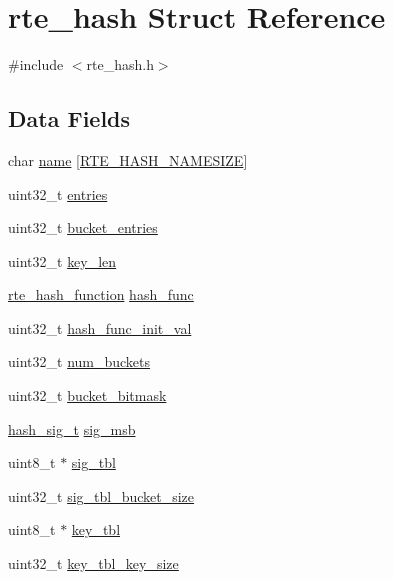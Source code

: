 \hypertarget{structrte__hash}{}\section{rte\+\_\+hash Struct Reference}
\label{structrte__hash}


{\ttfamily \#include $<$rte\+\_\+hash.\+h$>$}

\subsection*{Data Fields}
\begin{DoxyCompactItemize}
\item 
char \hyperlink{structrte__hash_a43ab7746b9b72f04b2e6dadf8365f41b}{name} \mbox{[}\hyperlink{rte__hash_8h_a6f2eca61b3180fccd47b5170fa115d48}{R\+T\+E\+\_\+\+H\+A\+S\+H\+\_\+\+N\+A\+M\+E\+S\+I\+Z\+E}\mbox{]}
\item 
uint32\+\_\+t \hyperlink{structrte__hash_a38bad35c844ffd72b0c1132715d5f3a1}{entries}
\item 
uint32\+\_\+t \hyperlink{structrte__hash_ad1c0b79e09e6b654bc7c268a9ec0084f}{bucket\+\_\+entries}
\item 
uint32\+\_\+t \hyperlink{structrte__hash_a7250588fe859c80e349c79c2b15ee421}{key\+\_\+len}
\item 
\hyperlink{rte__hash_8h_a1b12fdd40a9aa9aa254d45b052e57350}{rte\+\_\+hash\+\_\+function} \hyperlink{structrte__hash_aca908537bdd20d4ca4d4c7fd6c392903}{hash\+\_\+func}
\item 
uint32\+\_\+t \hyperlink{structrte__hash_a01ac433d404852455c8fb211a4d43b2a}{hash\+\_\+func\+\_\+init\+\_\+val}
\item 
uint32\+\_\+t \hyperlink{structrte__hash_aa457ee935be1ba725024ac93fd2b2896}{num\+\_\+buckets}
\item 
uint32\+\_\+t \hyperlink{structrte__hash_ace627da91a44de34422973f54013cb33}{bucket\+\_\+bitmask}
\item 
\hyperlink{rte__hash_8h_ab9cf833d6d86f042b9ac01ae2e5b998f}{hash\+\_\+sig\+\_\+t} \hyperlink{structrte__hash_a17ac80472532608bad56604064f4ed77}{sig\+\_\+msb}
\item 
uint8\+\_\+t $\ast$ \hyperlink{structrte__hash_aa92b2a3ccd0e79ebaafdf2073ea5eaa5}{sig\+\_\+tbl}
\item 
uint32\+\_\+t \hyperlink{structrte__hash_a7f46f8e3d54c9e6a98604123e9dbce11}{sig\+\_\+tbl\+\_\+bucket\+\_\+size}
\item 
uint8\+\_\+t $\ast$ \hyperlink{structrte__hash_ae8f0ffce9df01bf76b73b1e40656598f}{key\+\_\+tbl}
\item 
uint32\+\_\+t \hyperlink{structrte__hash_a349faae39ef20968ac3cdc835c18ba00}{key\+\_\+tbl\+\_\+key\+\_\+size}
\end{DoxyCompactItemize}


